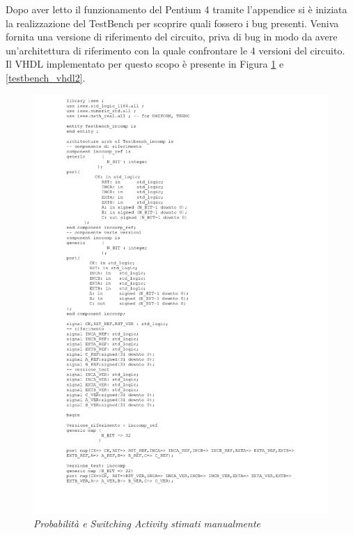 Dopo aver letto il funzionamento del Pentium 4 tramite l'appendice si è iniziata la realizzazione del TestBench per scoprire quali fossero i bug presenti. Veniva fornita una versione di riferimento del circuito, priva di bug in modo da avere un'architettura di riferimento con la quale confrontare le 4 versioni del circuito.\\
Il VHDL implementato per questo scopo è presente in Figura \ref{testbench_vhdl1} e \ref{testbench_vhdl2}.
\begin{figure}[!htb]
	\centering
	\includegraphics[scale=0.3]{immagini/testbench_vhdl1}
	\caption{\textit{Probabilità e Switching Activity stimati manualmente}}
	\label{testbench_vhdl1}
\end{figure}
